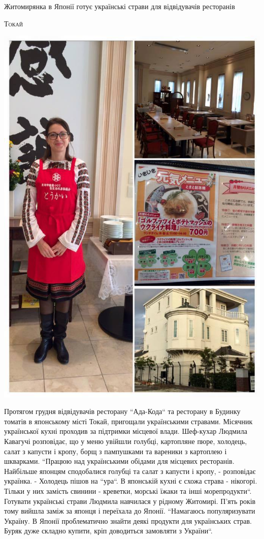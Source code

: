 \documentclass[10pt,a4paper]{article}
\newcommand{\NewsItem}[1]{%
		\usefont{T2A}{iwona}{m}{n} 
		\large #1 \vspace{4pt}
		\par \normalsize \normalfont}
\newcommand{\NewsAuthor}[1]{%
			\hfill \textsc{#1} \vspace{4pt}
			\par \normalfont}
\begin{document}
\begin{multicols}{3}
\NewsItem{Житомирянка в Японії готує українські страви для відвідувачів ресторанів}
\NewsAuthor{Токай}
\begin{center}
\includegraphics[width=0.8\linewidth]{images/7}
\end{center}
Протягом грудня відвідувачів ресторану ``Ада-Кода`` та ресторану в Будинку томатів в японському місті Токай, пригощали українськими стравами. Місячник української кухні проходив за підтримки місцевої влади. Шеф-кухар Людмила Кавагучі розповідає, що у меню увійшли голубці, картопляне пюре, холодець, салат з капусти і кропу, борщ з пампушками та вареники з картоплею і шкварками. ``Працюю над українськими обідами для місцевих ресторанів. Найбільше японцям сподобалися голубці та салат з капусти і кропу, - розповідає українка. - Холодець пішов на ``ура``. В японській кухні є схожа страва - нікогорі. Тільки у них замість свинини - креветки, морські їжаки та інші морепродукти``. Готувати українські страви Людмила навчилася у рідному Житомирі. П'ять років тому вийшла заміж за японця і переїхала до Японії. ``Намагаюсь популяризувати Україну. В Японії проблематично знайти деякі продукти для українських страв. Буряк дуже складно купити, кріп доводиться замовляти з України``.


\end{multicols}
\end{document}
